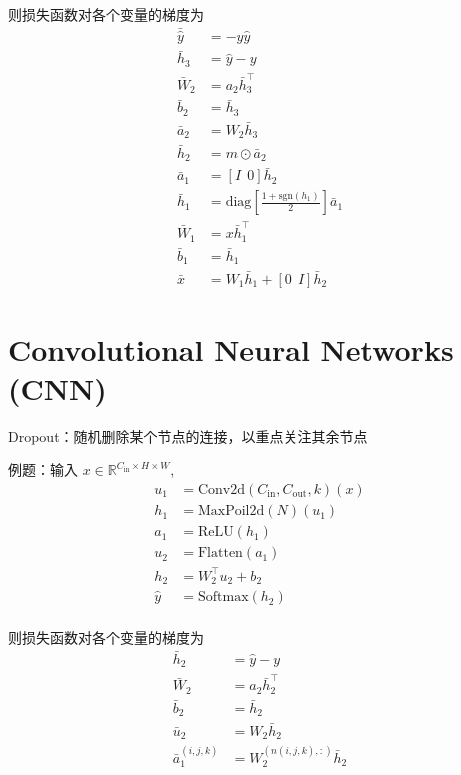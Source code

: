\documentclass[openany]{ctexbook}
\theoremstyle{kaiti}
\theoremstyle{normal}
\begin{document}
则损失函数对各个变量的梯度为
\begin{equation}
  \begin{aligned}
    \bar{\hat{y}}&=-y\hat{y} \\
    \bar{h}_3&=\hat{y}-y \\
    \bar{W}_2&=a_2\bar{h}_{3}^{\top} \\
    \bar{b}_2&=\bar{h}_3 \\
    \bar{a}_2&=W_2\bar{h}_3\\
    \bar{h}_2&=m\odot \bar{a}_2 \\
    \bar{a}_1&=\left[I~~0 \right] \bar{h}_2 \\
    \bar{h}_1&=\mathrm{diag}\left[\frac{1+\mathrm{sgn} \left(h_1 \right)}{2}\right]\bar{a}_1\\
    \bar{W}_1&=x\bar{h}_{1}^{\top} \\
    \bar{b}_1&=\bar{h}_1 \\
    \bar{x}&=W_1\bar{h}_1+\left[0~~I\right] \bar{h}_2
  \end{aligned}
\end{equation}

\section{Convolutional Neural Networks (CNN)}

Dropout：随机删除某个节点的连接，以重点关注其余节点

例题：输入 $x\in \mathbb{R} ^{C_{\mathrm{in}}\times H\times W}$, 
\begin{equation}
  \begin{aligned}
    u_1&=\mathrm{Conv}2\mathrm{d}\left(C_{\mathrm{in}},C_{\mathrm{out}},k \right)(x)\\
    h_1&=\mathrm{MaxPoil}2\mathrm{d}\left(N \right)\left(u_1 \right) \\
    a_1&=\mathrm{ReLU}\left(h_1 \right) \\
    u_2&=\mathrm{Flatten}\left(a_1 \right)\\
    h_2&=W_{2}^{\top}u_2+b_2 \\
    \hat{y}&=\mathrm{Softmax} \left(h_2 \right)\\
  \end{aligned}
\end{equation}

则损失函数对各个变量的梯度为
\begin{equation}
  \begin{aligned}
    \bar{h}_2&=\hat{y}-y \\
    \bar{W}_2&=a_2\bar{h}_{2}^{\top}\\
    \bar{b}_2&=\bar{h}_2 \\
    \bar{u}_2&=W_2\bar{h}_2 \\
    \bar{a}_{1}^{\left(i,j,k \right)}&=W_{2}^{\left(n\left(i,j,k \right),: \right)}\bar{h}_2
  \end{aligned}
\end{equation}
\end{document}
